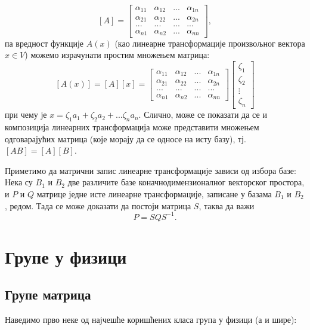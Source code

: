 \documentclass{report}
\theoremstyle{plain}
\theoremstyle{definition}
\begin{document}
$$[A] = \begin{bmatrix}
    \alpha_{11} & \alpha_{12} & ... & \alpha_{1n} \\
    \alpha_{21} & \alpha_{22} & ... & \alpha_{2n} \\
    ... & ... & ... & ... \\
    \alpha_{n1} & \alpha_{n2} & ... & \alpha_{nn}
  \end{bmatrix},$$
па вредност функције $A(x)$ (као линеарне трансформације произвољног вектора $x\in V$) можемо израчунати простим множењем матрица:
$$[A(x)] = [A][x] = \begin{bmatrix}
            \alpha_{11} & \alpha_{12} & ... & \alpha_{1n} \\
            \alpha_{21} & \alpha_{22} & ... & \alpha_{2n} \\
            ... & ... & ... & ... \\
            \alpha_{n1} & \alpha_{n2} & ... & \alpha_{nn}
           \end{bmatrix}
           \begin{bmatrix}
           \zeta_1\\
           \zeta_2\\
           \vdots \\
           \zeta_n
           \end{bmatrix}
$$
при чему је $x = \zeta_1 a_1 + \zeta_2 a_2 + ... \zeta_n a_n$. Слично, може се показати да се и композиција линеарних трансформација може представити множењем одговарајућих матрица (које морају да се односе на исту базу), тј. $[AB] = [A][B]$.

Приметимо да матрични запис линеарне трансформације зависи од избора базе:\\
Нека су $B_1$ и $B_2$ две различите базе коначнодимензионалног векторског простора, и $P$ и $Q$ матрице једне исте линеарне трансформације, записане у базама $B_1$ и $B_2$, редом. Тада се може доказати да постоји матрица $S$, таква да важи
$$P = SQS^{-1}.$$

\chapter{Групе у физици}

\section{Групе матрица}

Наведимо прво неке од најчешће коришћених класа група у физици (а и шире):
\end{document}
